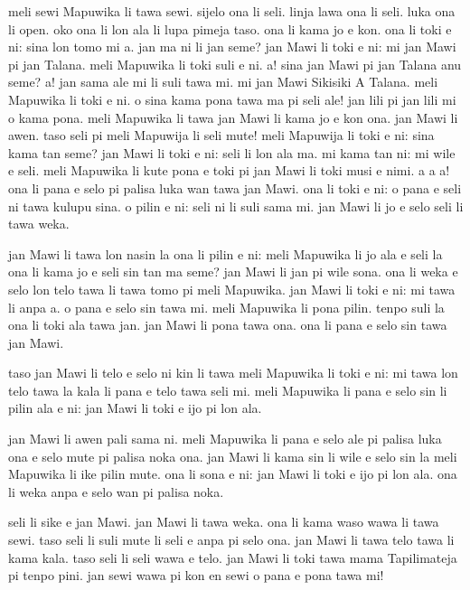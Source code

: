 meli sewi Mapuwika li tawa sewi. 
sijelo ona li seli. 
linja lawa ona li seli. 
luka ona li open. 
oko ona li lon ala li lupa pimeja taso. 
ona li kama jo e kon.
ona li toki e ni: \glqq sina lon tomo mi a. 
jan ma ni li jan seme?\grqq   
jan Mawi li toki e ni: \glqq mi jan Mawi pi jan Talana.\grqq   
meli Mapuwika li toki suli e ni. 
\grqq   a! 
sina jan Mawi pi jan Talana anu seme?\grqq   
\grqq   a! 
jan sama ale mi li suli tawa mi. 
mi jan Mawi Sikisiki A Talana.\grqq   
meli Mapuwika li toki e ni. 
\grqq   o sina kama pona tawa ma pi seli ale! 
jan lili pi jan lili mi o kama pona.\grqq   
meli Mapuwika li tawa jan Mawi li kama jo e kon ona. 
jan Mawi li awen. 
taso seli pi meli Mapuwija li seli mute!
meli Mapuwija li toki e ni: \glqq sina kama tan seme?\grqq   
jan Mawi li toki e ni: \glqq seli li lon ala ma. 
mi kama tan ni: mi wile e seli.\grqq   
meli Mapuwika li kute pona e toki pi jan Mawi li toki musi e nimi. \glqq a a a!\grqq   
ona li pana e selo pi palisa luka wan tawa jan Mawi. 
ona li toki e ni: \glqq o pana e seli ni tawa kulupu sina. 
o pilin e ni: seli ni li suli sama mi.\grqq   
jan Mawi li jo e selo seli li tawa weka.

jan Mawi li tawa lon nasin la ona li pilin e ni: 
\grqq   meli Mapuwika li jo ala e seli la ona li kama jo e seli sin tan ma seme?\grqq   
jan Mawi li jan pi wile sona. 
ona li weka e selo lon telo tawa li tawa tomo pi meli Mapuwika.
jan Mawi li toki e ni: \glqq mi tawa li anpa a. 
o pana e selo sin tawa mi.\grqq   
meli Mapuwika li pona pilin. 
tenpo suli la ona li toki ala tawa jan. 
jan Mawi li pona tawa ona. 
ona li pana e selo sin tawa jan Mawi.

taso jan Mawi li telo e selo ni kin li tawa meli Mapuwika li toki e ni: 
\grqq   mi tawa lon telo tawa la kala li pana e telo tawa seli mi.\grqq   
meli Mapuwika li pana e selo sin li pilin ala e ni: jan Mawi li toki e ijo pi lon ala.

jan Mawi li awen pali sama ni. 
meli Mapuwika li pana e selo ale pi palisa luka ona e selo mute pi palisa noka ona. 
jan Mawi li kama sin li wile e selo sin la meli Mapuwika li ike pilin mute. 
ona li sona e ni: jan Mawi li toki e ijo pi lon ala. 
ona li weka anpa e selo wan pi palisa noka.

seli li sike e jan Mawi. 
jan Mawi li tawa weka. 
ona li kama waso wawa li tawa sewi. 
taso seli li suli mute li seli e anpa pi selo ona. 
jan Mawi li tawa telo tawa li kama kala. 
taso seli li seli wawa e telo. 
jan Mawi li toki tawa mama Tapilimateja pi tenpo pini. 
\grqq   jan sewi wawa pi kon en sewi o pana e pona tawa mi!\grqq   

